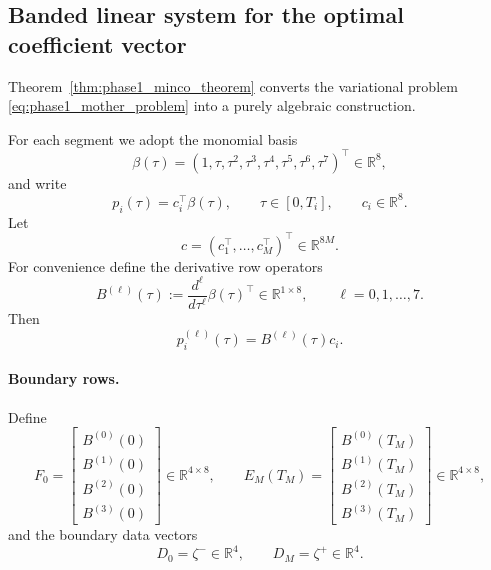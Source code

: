 \subsection{Banded linear system for the optimal coefficient vector}
\label{subsec:phase1_banded_system}

Theorem~\ref{thm:phase1_minco_theorem} converts the variational problem
\eqref{eq:phase1_mother_problem} into a purely algebraic construction.

For each segment we adopt the monomial basis
\[
  \beta(\tau)
  =
  (1,\tau,\tau^2,\tau^3,\tau^4,\tau^5,\tau^6,\tau^7)^\top \in \mathbb R^8,
\]
and write
\begin{equation}
  \label{eq:phase1_segment_poly}
  p_i(\tau)=c_i^\top \beta(\tau),
  \qquad
  \tau\in[0,T_i],
  \qquad
  c_i\in\mathbb R^8.
\end{equation}
Let
\[
  c=(c_1^\top,\dots,c_M^\top)^\top \in \mathbb R^{8M}.
\]
For convenience define the derivative row operators
\[
  B^{(\ell)}(\tau)
  :=
  \frac{d^\ell}{d\tau^\ell}\beta(\tau)^\top
  \in \mathbb R^{1\times 8},
  \qquad
  \ell=0,1,\dots,7.
\]
Then
\[
  p_i^{(\ell)}(\tau)=B^{(\ell)}(\tau)c_i.
\]

\paragraph{Boundary rows.}
Define
\begin{equation}
  \label{eq:phase1_boundary_blocks}
  F_0
  =
  \begin{bmatrix}
    B^{(0)}(0)\\
    B^{(1)}(0)\\
    B^{(2)}(0)\\
    B^{(3)}(0)
  \end{bmatrix}
  \in\mathbb R^{4\times 8},
  \qquad
  E_M(T_M)
  =
  \begin{bmatrix}
    B^{(0)}(T_M)\\
    B^{(1)}(T_M)\\
    B^{(2)}(T_M)\\
    B^{(3)}(T_M)
  \end{bmatrix}
  \in\mathbb R^{4\times 8},
\end{equation}
and the boundary data vectors
\begin{equation}
  \label{eq:phase1_boundary_rhs}
  D_0=\zeta^- \in\mathbb R^4,
  \qquad
  D_M=\zeta^+ \in\mathbb R^4.
\end{equation}

